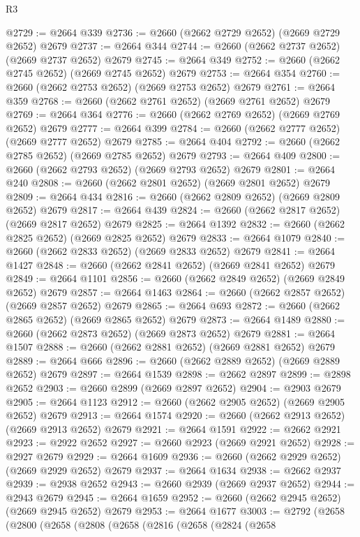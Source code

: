 \begin{lexlean}{R3}
\begin{coremodule}
@2729 := @2664 @339
@2736 := @2660 (@2662 @2729 @2652) (@2669 @2729 @2652) @2679
@2737 := @2664 @344
@2744 := @2660 (@2662 @2737 @2652) (@2669 @2737 @2652) @2679
@2745 := @2664 @349
@2752 := @2660 (@2662 @2745 @2652) (@2669 @2745 @2652) @2679
@2753 := @2664 @354
@2760 := @2660 (@2662 @2753 @2652) (@2669 @2753 @2652) @2679
@2761 := @2664 @359
@2768 := @2660 (@2662 @2761 @2652) (@2669 @2761 @2652) @2679
@2769 := @2664 @364
@2776 := @2660 (@2662 @2769 @2652) (@2669 @2769 @2652) @2679
@2777 := @2664 @399
@2784 := @2660 (@2662 @2777 @2652) (@2669 @2777 @2652) @2679
@2785 := @2664 @404
@2792 := @2660 (@2662 @2785 @2652) (@2669 @2785 @2652) @2679
@2793 := @2664 @409
@2800 := @2660 (@2662 @2793 @2652) (@2669 @2793 @2652) @2679
@2801 := @2664 @240
@2808 := @2660 (@2662 @2801 @2652) (@2669 @2801 @2652) @2679
@2809 := @2664 @434
@2816 := @2660 (@2662 @2809 @2652) (@2669 @2809 @2652) @2679
@2817 := @2664 @439
@2824 := @2660 (@2662 @2817 @2652) (@2669 @2817 @2652) @2679
@2825 := @2664 @1392
@2832 := @2660 (@2662 @2825 @2652) (@2669 @2825 @2652) @2679
@2833 := @2664 @1079
@2840 := @2660 (@2662 @2833 @2652) (@2669 @2833 @2652) @2679
@2841 := @2664 @1427
@2848 := @2660 (@2662 @2841 @2652) (@2669 @2841 @2652) @2679
@2849 := @2664 @1101
@2856 := @2660 (@2662 @2849 @2652) (@2669 @2849 @2652) @2679
@2857 := @2664 @1463
@2864 := @2660 (@2662 @2857 @2652) (@2669 @2857 @2652) @2679
@2865 := @2664 @693
@2872 := @2660 (@2662 @2865 @2652) (@2669 @2865 @2652) @2679
@2873 := @2664 @1489
@2880 := @2660 (@2662 @2873 @2652) (@2669 @2873 @2652) @2679
@2881 := @2664 @1507
@2888 := @2660 (@2662 @2881 @2652) (@2669 @2881 @2652) @2679
@2889 := @2664 @666
@2896 := @2660 (@2662 @2889 @2652) (@2669 @2889 @2652) @2679
@2897 := @2664 @1539
@2898 := @2662 @2897
@2899 := @2898 @2652
@2903 := @2660 @2899 (@2669 @2897 @2652)
@2904 := @2903 @2679
@2905 := @2664 @1123
@2912 := @2660 (@2662 @2905 @2652) (@2669 @2905 @2652) @2679
@2913 := @2664 @1574
@2920 := @2660 (@2662 @2913 @2652) (@2669 @2913 @2652) @2679
@2921 := @2664 @1591
@2922 := @2662 @2921
@2923 := @2922 @2652
@2927 := @2660 @2923 (@2669 @2921 @2652)
@2928 := @2927 @2679
@2929 := @2664 @1609
@2936 := @2660 (@2662 @2929 @2652) (@2669 @2929 @2652) @2679
@2937 := @2664 @1634
@2938 := @2662 @2937
@2939 := @2938 @2652
@2943 := @2660 @2939 (@2669 @2937 @2652)
@2944 := @2943 @2679
@2945 := @2664 @1659
@2952 := @2660 (@2662 @2945 @2652) (@2669 @2945 @2652) @2679
@2953 := @2664 @1677
@3003 := @2792
    (@2658
      (@2800
        (@2658
          (@2808
            (@2658
              (@2816
                (@2658
                  (@2824
                    (@2658

\end{coremodule}
\end{lexlean}
